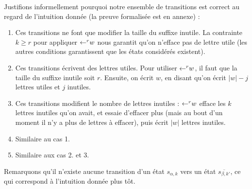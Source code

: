 \documentclass[12pt, a4paper]{article}
\renewcommand{\bar}{\overline}
\begin{document}
    
    Justifions informellement pourquoi notre ensemble de transitions est correct au regard de l'intuition donnée (la preuve formalisée est en annexe) :
    \begin{enumerate}
        \item Ces transitions ne font que modifier la taille du suffixe inutile. La contrainte $k \geqslant r$ pour appliquer $\mathord{\leftarrow}^r w$ nous garantit qu'on n'efface pas de lettre utile (les autres conditions garantissent que les états considérés existent).
        \item Ces transitions écrivent des lettres utiles. Pour utiliser $\mathord{\leftarrow}^r w$, il faut que la taille du suffixe inutile soit $r$. Ensuite, on écrit $w$, en disant qu'on écrit $|w|-j$ lettres utiles et $j$ inutiles.
        \item Ces transitions modifient le nombre de lettres inutiles : $\mathord{\leftarrow}^r w$ efface les $k$ lettres inutiles qu'on avait, et essaie d'effacer plus (mais au bout d'un moment il n'y a plus de lettres à effacer), puis écrit $|w|$ lettres inutiles.
        \item Similaire au cas 1.
        \item Similaire aux cas 2. et 3.
    \end{enumerate}
    Remarquons qu'il n'existe aucune transition d'un état $s_{\alpha, k}$ vers un état $\bar{s_{\beta, k'}}$, ce qui correspond à l'intuition donnée plus tôt.
    
\end{document}
